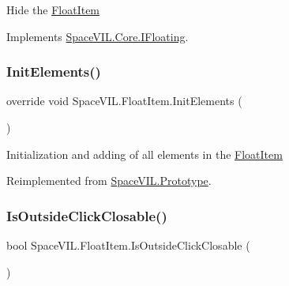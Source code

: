Hide the \mbox{\hyperlink{class_space_v_i_l_1_1_float_item}{Float\+Item}} 



Implements \mbox{\hyperlink{interface_space_v_i_l_1_1_core_1_1_i_floating}{Space\+V\+I\+L.\+Core.\+I\+Floating}}.

\mbox{\label{class_space_v_i_l_1_1_float_item_adf2e88b89c3ce9ec105fae8ac66390e4}} 
\subsubsection{\texorpdfstring{Init\+Elements()}{InitElements()}}
{\footnotesize\ttfamily override void Space\+V\+I\+L.\+Float\+Item.\+Init\+Elements (\begin{DoxyParamCaption}{ }\end{DoxyParamCaption})\hspace{0.3cm}{\ttfamily [virtual]}}



Initialization and adding of all elements in the \mbox{\hyperlink{class_space_v_i_l_1_1_float_item}{Float\+Item}} 



Reimplemented from \mbox{\hyperlink{class_space_v_i_l_1_1_prototype_ac3379fe02923ee155b5b0084abf27420}{Space\+V\+I\+L.\+Prototype}}.

\mbox{\label{class_space_v_i_l_1_1_float_item_a491aaaddc768c4676ecfb5c7405ec167}} 
\subsubsection{\texorpdfstring{Is\+Outside\+Click\+Closable()}{IsOutsideClickClosable()}}
{\footnotesize\ttfamily bool Space\+V\+I\+L.\+Float\+Item.\+Is\+Outside\+Click\+Closable (\begin{DoxyParamCaption}{ }\end{DoxyParamCaption})}



